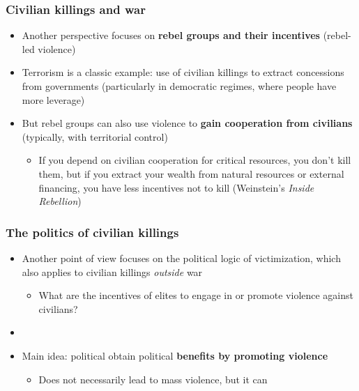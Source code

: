 \documentclass[aspectratio=43]{beamer}
\begin{document}
\begin{frame}
\frametitle{Civilian killings and war}
\centering

\begin{itemize}
  \item<1-> Another perspective focuses on \textbf{rebel groups and their incentives} (rebel-led violence)
  \item<2-> Terrorism is a classic example: use of civilian killings to extract concessions from governments (particularly in democratic regimes, where people have more leverage)
  \item<3-> But rebel groups can also use violence to \textbf{gain cooperation from civilians} (typically, with territorial control)
  \begin{itemize}
    \item If you depend on civilian cooperation for critical resources, you don't kill them, but if you extract your wealth from natural resources or external financing, you have less incentives not to kill (Weinstein's \textit{Inside Rebellion})
  \end{itemize}
\end{itemize}

\end{frame}

\begin{frame}
\frametitle{The politics of civilian killings}
\centering

\begin{itemize}
  \item<1-> Another point of view focuses on the political logic of victimization, which also applies to civilian killings \textit{outside} war
  \begin{itemize}
    \item What are the incentives of elites to engage in or promote violence against civilians?
  \end{itemize}
  \item[]
  \item<2-> Main idea: political  obtain political \textbf{benefits by promoting violence}
  \begin{itemize}
    \item Does not necessarily lead to mass violence, but it can
  \end{itemize}
\end{itemize}

\end{frame}
\end{document}
